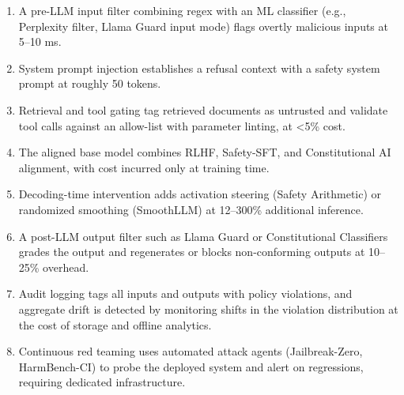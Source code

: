 \begin{enumerate}
\def\labelenumi{\arabic{enumi}.}
\tightlist
\item
  A pre-LLM input filter combining regex with an ML classifier (e.g., Perplexity filter, Llama Guard input mode) flags overtly malicious inputs at 5--10 ms.
\item
  System prompt injection establishes a refusal context with a safety system prompt at roughly 50 tokens.
\item
  Retrieval and tool gating tag retrieved documents as untrusted and validate tool calls against an allow-list with parameter linting, at \textless5\% cost.
\item
  The aligned base model combines RLHF, Safety-SFT, and Constitutional AI alignment, with cost incurred only at training time.
\item
  Decoding-time intervention adds activation steering (Safety Arithmetic) or randomized smoothing (SmoothLLM) at 12--300\% additional inference.
\item
  A post-LLM output filter such as Llama Guard or Constitutional Classifiers grades the output and regenerates or blocks non-conforming outputs at 10--25\% overhead.
\item
  Audit logging tags all inputs and outputs with policy violations, and aggregate drift is detected by monitoring shifts in the violation distribution at the cost of storage and offline analytics.
\item
  Continuous red teaming uses automated attack agents (Jailbreak-Zero, HarmBench-CI) to probe the deployed system and alert on regressions, requiring dedicated infrastructure.
\end{enumerate}


